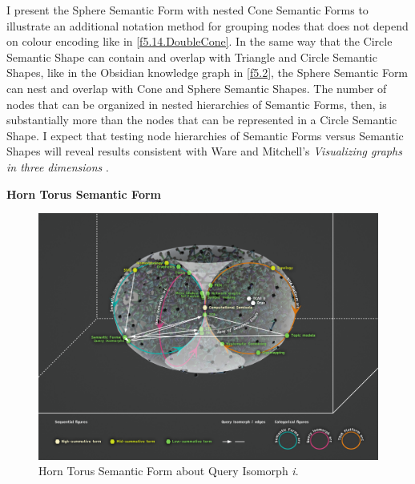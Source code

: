 I present the Sphere Semantic Form with nested Cone Semantic Forms to illustrate an additional notation method for grouping nodes that does not depend on colour encoding like in \autoref{f5.14.DoubleCone}. In the same way that the Circle Semantic Shape can contain and overlap with Triangle and Circle Semantic Shapes, like in the Obsidian knowledge graph in \autoref{f5.2}, the Sphere Semantic Form can nest and overlap with Cone and Sphere Semantic Shapes. The number of nodes that can be organized in nested hierarchies of Semantic Forms, then, is substantially more than the nodes that can be represented in a Circle Semantic Shape. I expect that testing node hierarchies of Semantic Forms versus Semantic Shapes will reveal results consistent with Ware and Mitchell's \textit{Visualizing graphs in three dimensions} \citep[p. 10]{ware_visualizing_2008}. 

\noindent \textbf{Horn Torus Semantic Form}

\FloatBarrier  
\begin{figure}[h!]
    \centering
    \includegraphics[width=\textwidth]{figures/5.16.HT2.png}
    \caption[Horn Torus Semantic Form about Query Isomorph \textit{i}]{Horn Torus Semantic Form about Query Isomorph \textit{i}.}
    \label{f5.16.HT2}
\end{figure}
\FloatBarrier  

